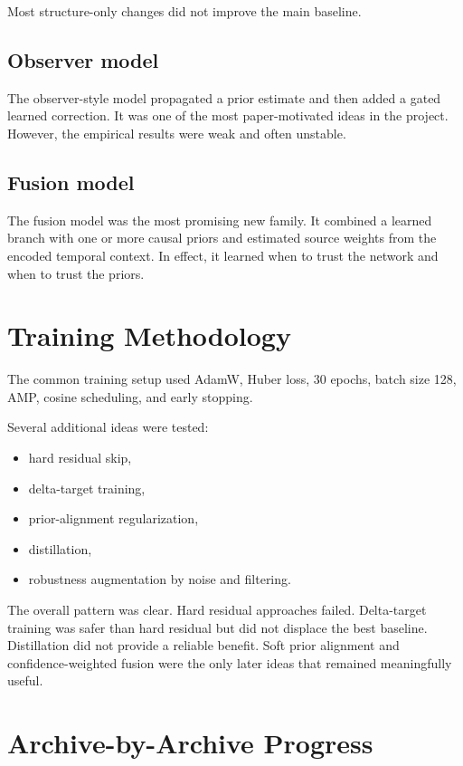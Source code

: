 \documentclass[11pt,a4paper]{article}
\begin{document}
Most structure-only changes did not improve the main baseline.

\subsection{Observer model}

The observer-style model propagated a prior estimate and then added a gated learned correction. It was one of the most paper-motivated ideas in the project. However, the empirical results were weak and often unstable.

\subsection{Fusion model}

The fusion model was the most promising new family. It combined a learned branch with one or more causal priors and estimated source weights from the encoded temporal context. In effect, it learned when to trust the network and when to trust the priors.

\section{Training Methodology}

The common training setup used AdamW, Huber loss, 30 epochs, batch size 128, AMP, cosine scheduling, and early stopping.

Several additional ideas were tested:

\begin{itemize}
\item hard residual skip,
\item delta-target training,
\item prior-alignment regularization,
\item distillation,
\item robustness augmentation by noise and filtering.
\end{itemize}

The overall pattern was clear. Hard residual approaches failed. Delta-target training was safer than hard residual but did not displace the best baseline. Distillation did not provide a reliable benefit. Soft prior alignment and confidence-weighted fusion were the only later ideas that remained meaningfully useful.

\section{Archive-by-Archive Progress}
\end{document}
